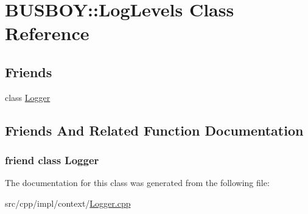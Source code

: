 \hypertarget{classBUSBOY_1_1LogLevels}{
\section{BUSBOY::LogLevels Class Reference}
\label{classBUSBOY_1_1LogLevels}
}
\subsection*{Friends}
\begin{DoxyCompactItemize}
\item 
class \hyperlink{classBUSBOY_1_1LogLevels_aff02b76416d2846736b7ecd798921a0a}{Logger}
\end{DoxyCompactItemize}


\subsection{Friends And Related Function Documentation}
\hypertarget{classBUSBOY_1_1LogLevels_aff02b76416d2846736b7ecd798921a0a}{
\subsubsection[{Logger}]{\setlength{\rightskip}{0pt plus 5cm}friend class {\bf Logger}}}
\label{classBUSBOY_1_1LogLevels_aff02b76416d2846736b7ecd798921a0a}


The documentation for this class was generated from the following file:\begin{DoxyCompactItemize}
\item 
src/cpp/impl/context/\hyperlink{Logger_8cpp}{Logger.cpp}\end{DoxyCompactItemize}
